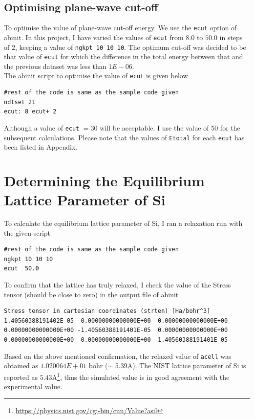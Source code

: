 \documentclass[12pt]{article} %
\begin{document}
\subsection{Optimising plane-wave cut-off}

To optimise the value of plane-wave cut-off energy. We use the \verb|ecut| option of abinit. In this project, I have varied the values of \verb|ecut| from $8.0$ to $50.0$ in steps of $2$, keeping a value of \verb|ngkpt 10 10 10|. The optimum cut-off was decided to be that value of \verb|ecut| for which the difference in the total energy between that and the previous dataset was less than $1E-06$.\\
The abinit script to optimise the value of \verb|ecut| is given below
\begin{verbatim}
#rest of the code is same as the sample code given
ndtset 21 
ecut: 8 ecut+ 2
\end{verbatim}
Although a value of \verb|ecut| $= 30$ will be acceptable. I use the value of 50 for the subsequent calculations. Please note that the values of \verb|Etotal| for each \verb|ecut| has been listed in Appendix.

\section{Determining the Equilibrium Lattice Parameter of Si}

To calculate the equilibrium lattice parameter of Si, I ran a relaxation run with the given script
\begin{verbatim}
#rest of the code is same as the sample code given
ngkpt 10 10 10
ecut  50.0
\end{verbatim}
To confirm that the lattice has truly relaxed, I check the value of the Stress tensor (should be close to zero) in the output file of abinit
\begin{verbatim}
Stress tensor in cartesian coordinates (strten) [Ha/bohr^3]
1.40560388191402E-05  0.00000000000000E+00  0.00000000000000E+00
0.00000000000000E+00 -1.40560388191401E-05  0.00000000000000E+00
0.00000000000000E+00  0.00000000000000E+00 -1.40560388191401E-05
\end{verbatim}
Based on the above mentioned confirmation, the relaxed value of \verb|acell| was obtained as $1.020064E+01$ bohr ($\sim$ 5.39A). The NIST lattice parameter of Si is reported as $5.43$A\footnote{\href{}{https://physics.nist.gov/cgi-bin/cuu/Value?asil}}, thus the simulated value is in good agreement with the experimental value.
\end{document}
